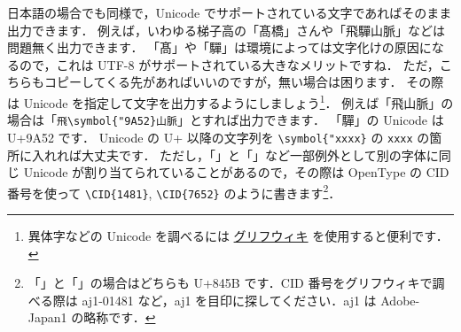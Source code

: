 日本語の場合でも同様で，Unicode でサポートされている文字であればそのまま出力できます．
例えば，いわゆる梯子高の「髙橋」さんや「飛驒山脈」などは問題無く出力できます．
「髙」や「驒」は環境によっては文字化けの原因になるので，これは UTF-8 がサポートされている大きなメリットですね．
ただ，こちらもコピーしてくる先があればいいのですが，無い場合は困ります．
その際は Unicode を指定して文字を出力するようにしましょう\footnote{異体字などの Unicode を調べるには \href{https://glyphwiki.org/wiki/}{グリフウィキ} を使用すると便利です．}．
例えば「飛山脈」の場合は「\verb|飛\symbol{"9A52}山脈|」とすれば出力できます．
「驒」の Unicode は U+9A52 です．
Unicode の U+ 以降の文字列を \verb|\symbol{"xxxx}| の \verb|xxxx| の箇所に入れれば大丈夫です．
ただし，「」と「」など一部例外として別の字体に同じ Unicode が割り当てられていることがあるので，その際は OpenType の CID 番号を使って \verb|\CID{1481}|, \verb|\CID{7652}| のように書きます\footnote{「」と「」の場合はどちらも U+845B です．CID 番号をグリフウィキで調べる際は aj1-01481 など，aj1 を目印に探してください．aj1 は Adobe-Japan1 の略称です．}．



